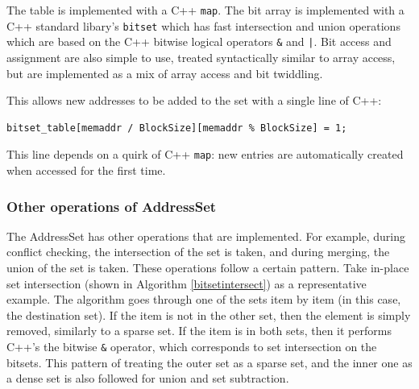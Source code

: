 \documentclass[12pt,twoside]{reedthesis}
\begin{document}
			The table is implemented with a C++ \texttt{map}.
			The bit array is implemented with a C++ standard libary's \texttt{bitset} which has fast intersection and union operations which are based on the C++ bitwise logical operators \texttt{\&} and \texttt{|}. Bit access and assignment are also simple to use, treated syntactically similar to array access, but are implemented as a mix of array access and bit twiddling. %
			
			This allows new addresses to be added to the set with a single line of C++:
\begin{verbatim}
bitset_table[memaddr / BlockSize][memaddr % BlockSize] = 1;
\end{verbatim}
			This line depends on a quirk of C++ \texttt{map}: new entries are automatically created when accessed for the first time. 
			
			\subsubsection{Other operations of AddressSet}
			
			The AddressSet has other operations that are implemented. For example, during conflict checking, the intersection of the set is taken, and during merging, the union of the set is taken. 
			These operations follow a certain pattern. Take in-place set intersection (shown in Algorithm \ref{bitsetintersect}) as a representative example. The algorithm goes through one of the sets item by item (in this case, the destination set). If the item is not in the other set, then the element is simply removed, similarly to a sparse set. If the item is in both sets, then it performs C++'s the bitwise \texttt{\&} operator, which corresponds to set intersection on the bitsets. This pattern of treating the outer set as a sparse set, and the inner one as a dense set is also followed for union and set subtraction. 
			
			
			
			
\end{document}
